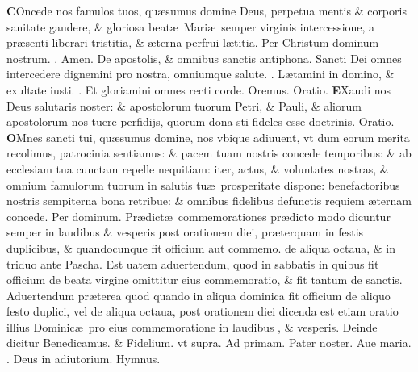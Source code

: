 \documentclass[a5paper,10pt]{book}
\def\ae{æ}
\begin{document}
\begin{multicols*}{2}
\vspace{-.25em}
\lettrine[lines=2]{\bfseries C}{}Oncede nos famulos tuos, qu\ae sumus domine Deus, perpetua mentis \& corporis sanitate gaudere, \& gloriosa beat\ae \ Mari\ae \ semper virginis intercessione, a pr\ae senti liberari tristitia, \& \ae terna perfrui l\ae titia. Per Christum dominum nostrum. \color{red} \Rbar . \color{black} Amen.
\newline \color{red} De apostolis, \& omnibus sanctis antiphona. \color{black} Sancti Dei omnes intercedere dignemini pro nostra, omniumque salute. \color{red} \Vbar . \color{black} L\ae tamini in domino, \& exultate iusti. \color{red} \Rbar . \color{black} Et gloriamini omnes recti corde. \color{red} O\color{black}remus. \color{red} Oratio. \color{black}
\vspace{-.25em}
\lettrine[lines=2]{\bfseries \color{red} E}{}Xaudi nos Deus salutaris noster: \& apostolorum tuorum Petri, \& Pauli, \& aliorum apostolorum nos tuere perfidijs, %
quorum dona sti fideles esse doctrinis. \color{red} Oratio. \color{black}
\vspace{-.25em}
\lettrine[lines=2]{\bfseries \color{red} O}{}Mnes sancti tui, qu\ae sumus domine, nos vbique adiuuent, vt dum eorum merita
recolimus, patrocinia sentiamus: \& pacem tuam nostris concede temporibus: \& ab ecclesiam tua cunctam repelle nequitiam: iter, actus, \& voluntates nostras, \& omnium famulorum tuorum in salutis tu\ae \ prosperitate dispone: benefactoribus nostris sempiterna bona retribue: \& omnibus fidelibus defunctis requiem \ae ternam concede. Per dominum.
\newline {} \color{red} Pr\ae dict\ae \ commemorationes pr\ae dicto modo dicuntur semper in laudibus \& vesperis post orationem diei, pr\ae terquam in festis duplicibus, \& quandocunque fit officium aut commemo. de aliqua octaua, \& in triduo ante Pascha. Est uatem aduertendum, quod in sabbatis in quibus fit officium de beata virgine omittitur eius commemoratio, \& fit tantum de sanctis. Aduertendum pr\ae terea quod quando in aliqua dominica fit officium de aliquo festo duplici, vel de aliqua octaua, post orationem diei dicenda est etiam oratio illius Dominic\ae \ pro eius commemoratione in laudibus , \& vesperis. Deinde dicitur \color{black} Benedicamus. \color{red} \& \color{black} Fidelium. \color{red} vt supra. Ad \hypertarget{DOM-PRIMA-ADV-PRIM}{primam.} \color{black}
Pater noster. Aue maria. \color{red} \Vbar . \color{black} Deus in adiutorium. \color{red} Hymnus. \color{black}

\end{multicols*}
\end{document}
